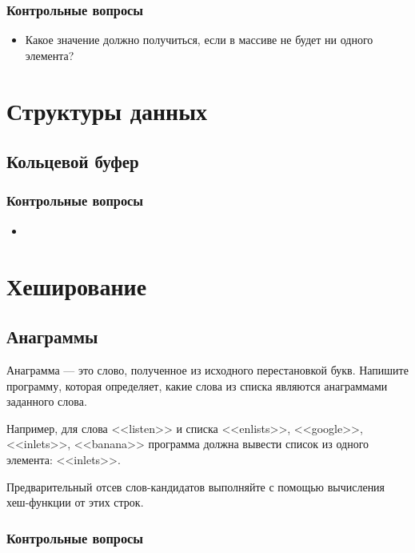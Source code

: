 \documentclass[10pt,twoside,openany]{book}
\begin{document}
\subsection*{Контрольные вопросы}

\begin{itemize}
    \item Какое значение должно получиться, если в массиве не будет ни одного элемента?
\end{itemize}

\chapter{Структуры данных}

\section{Кольцевой буфер}

\subsection*{Контрольные вопросы}

\begin{itemize}
    \item
\end{itemize}

\chapter{Хеширование}

\section{Анаграммы}

Анаграмма --- это слово, полученное из исходного перестановкой букв.
Напишите программу, которая определяет, какие слова из списка являются анаграммами
заданного слова.

Например, для слова <<listen>> и списка <<enlists>>, <<google>>, <<inlets>>, <<banana>>
программа должна вывести список из одного элемента: <<inlets>>.

Предварительный отсев слов-кандидатов выполняйте с помощью вычисления
хеш-функции от этих строк.

\subsection*{Контрольные вопросы}
\end{document}
